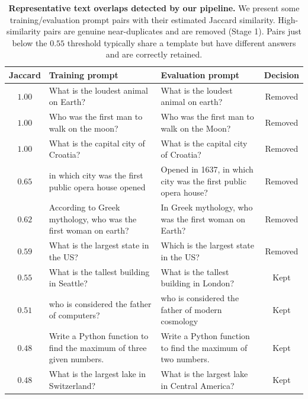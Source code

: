 \begin{table}[t]
    \centering
    \small
    \caption{\textbf{Representative text overlaps detected by our pipeline.} We present some training/evaluation prompt pairs with their estimated Jaccard similarity. High-similarity pairs are genuine near-duplicates and are removed (Stage 1). Pairs just below the $0.55$ threshold typically share a template but have different answers and are correctly retained.}
    \label{tab:textdecont-examples}
    \begin{tabularx}{\linewidth}{@{}c X X c@{}}
        \toprule
        \textbf{Jaccard} & \textbf{Training prompt} & \textbf{Evaluation prompt} & \textbf{Decision} \\
        \midrule
        $1.00$ & What is the loudest animal on Earth? & What is the loudest animal on earth? & \textcolor{lightred}{Removed} \\
        $1.00$ & Who was the first man to walk on the moon? & Who was the first man to walk on the Moon? & \textcolor{lightred}{Removed} \\
        $1.00$ & What is the capital city of Croatia? & What is the capital city of Croatia? & \textcolor{lightred}{Removed} \\
        $0.65$ & in which city was the first public opera house opened & Opened in 1637, in which city was the first public opera house? & \textcolor{lightred}{Removed} \\
        $0.62$ & According to Greek mythology, who was the first woman on earth? & In Greek mythology, who was the first woman on Earth? & \textcolor{lightred}{Removed} \\
        $0.59$ & What is the largest state in the US? & Which is the largest state in the US? & \textcolor{lightred}{Removed} \\
        \addlinespace
        $0.55$ & What is the tallest building in Seattle? & What is the tallest building in London? & \textcolor{nicergreen}{Kept} \\
        $0.51$ & who is considered the father of computers? & who is considered the father of modern cosmology & \textcolor{nicergreen}{Kept} \\
        $0.48$ & Write a Python function to find the maximum of three given numbers. & Write a Python function to find the maximum of two numbers. & \textcolor{nicergreen}{Kept} \\
        $0.48$ & What is the largest lake in Switzerland? & What is the largest lake in Central America? & \textcolor{nicergreen}{Kept} \\

\end{tabularx}
\end{table}
